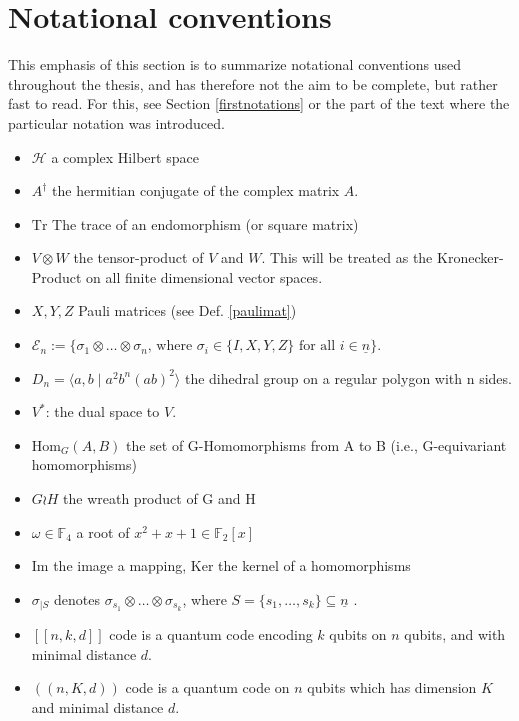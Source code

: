 \documentclass[12pt,a4paper,BCOR15mm,twoside,DIV12]{article}
\def\F{\mathbb{F}}
\def\n{\underline{n}}
\def\Hom{\text{Hom}}
\def\fa{\text{ for all }}
\def\Tr{\text{Tr}}
\theoremstyle{definition}
\begin{document}
\clearpage \newpage

\section*{Notational conventions}

This emphasis of this section is to summarize notational conventions used throughout the thesis, and has therefore not the aim to be complete, but rather fast to read. For this, see Section \ref{firstnotations} or the part of the text where the particular notation was introduced.
\begin{itemize}
\item $\mathcal{H}$ a complex Hilbert space
\item $A^\dagger$ the hermitian conjugate of the complex matrix $A$.
\item $\Tr$ The trace of an endomorphism (or square matrix)
\item $V \otimes W$ the tensor-product of $V$ and $W$. This will be treated as the Kronecker-Product on all finite dimensional vector spaces.
\item $X, Y, Z$ Pauli matrices (see Def. \ref{paulimat})
\item $\mathcal{E}_n:= \{ \sigma_1 \otimes \ldots \otimes \sigma_n \text{, where }\sigma_i \in \{ I,X,Y,Z \} \fa i \in \n \}$.
\item $D_n = \langle a, b \mid a^2 b^n (ab)^2 \rangle$ the dihedral group on a regular polygon with n sides.
\item $V^*$: the dual space to $V$.

\item $\Hom_{G}(A,B)$ the set of G-Homomorphisms from A to B (i.e., G-equivariant homomorphisms)
\item $ G \wr H$ the wreath product of G and H
\item $ \omega \in \F_4$ a root of $x^2 + x + 1 \in \F_2[x]$
\item Im the image a mapping, Ker the kernel of a homomorphisms
\item $\sigma_{\big| S}$ denotes $\sigma_{s_1} \otimes \ldots \otimes \sigma_{s_k}$, where $S = \{ s_1, \ldots, s_k \} \subseteq \n$ .
\item $[[n,k,d]]$ code is a quantum code encoding $k$ qubits on $n$ qubits, and with minimal distance $d$.
\item $((n,K,d))$ code is a quantum code on $n$ qubits which has dimension $K$ and minimal distance $d$.
\end{itemize}
\end{document}
